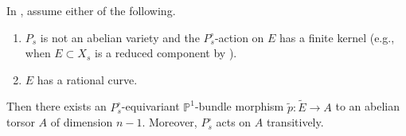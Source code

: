 \documentclass[reqno, letterpaper]{amsart}
\numberwithin{equation}{subsection}
\let\to\longrightarrow
\newcommand{\PP}{\mathbb{P}}
\begin{document}
		\begin{proposition} \label{prop:E normalization}
			In , assume either of the following.
			\begin{enumerate}[label = \textnormal{(\roman*)}, ref = \roman*]
				\item $P_s$ is not an abelian variety and the $P^\circ_s$-action on $E$ has a finite kernel (e.g., when $E \subset X_s$ is a reduced component by ).
				
				\item $E$ has a rational curve.
			\end{enumerate}
			Then there exists an $P^\circ_s$-equivariant $\PP^1$-bundle morphism $\tilde p : \tilde E \to A$ to an abelian torsor $A$ of dimension $n-1$. Moreover, $P^\circ_s$ acts on $A$ transitively.
		\end{proposition}
\end{document}
